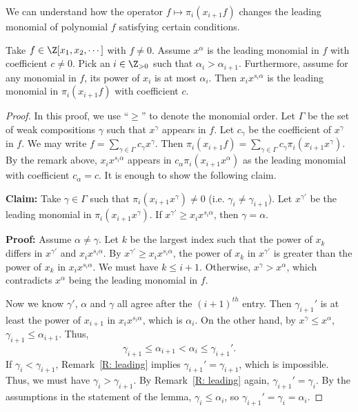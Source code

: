 We can understand how the operator
$f \mapsto \pi_i(x_{i+1} f)$ changes 
the leading monomial of polynomial $f$
satisfying certain conditions. 

\begin{lemma}
\label{L: monomials from operator}
Take $f \in \Z[x_1, x_2, \cdots ]$ with $f \neq 0$.
Assume $x^\alpha$ is the leading monomial in $f$ 
with coefficient $c \neq 0$.
Pick an $i\in \Z_{>0}$ such that $\alpha_{i} > \alpha_{i+1}$.
Furthermore, assume for any monomial in $f$, 
its power of $x_{i}$ is at most $\alpha_{i}$.
Then $x_ix^{s_i \alpha}$ is the leading monomial in
$\pi_{i}(x_{i+1}f)$ with coefficient $c$. 
\end{lemma}
\begin{proof}
In this proof, we use ``$\geq$'' to denote the 
monomial order.
Let $\Gamma$ be the set of weak compositions $\gamma$
such that $x^\gamma$ appears in $f$.
Let $c_\gamma$ be the coefficient of $x^\gamma$ in $f$.
We may write $f = \sum_{\gamma \in \Gamma} c_\gamma x^\gamma$.
Then 
$\pi_{i}(x_{i+1}f) = \sum_{\gamma \in \Gamma} c_\gamma \pi_{i}(x_{i+1}x^\gamma)$.
By the remark above, $x_ix^{s_i \alpha}$ appears 
in $c_\alpha\pi_i(x_{i+1}x^\alpha)$ as the leading monomial
with coefficient $c_\alpha = c$.
It is enough to show the following claim.

\noindent\textbf{Claim:} 
Take $\gamma \in \Gamma$ such that 
$\pi_i(x_{i+1}x^{\gamma}) \neq 0$ 
(i.e. $\gamma_i \neq \gamma_{i+1}$). 
Let $x^{\gamma'}$ be the leading monomial 
in $\pi_i(x_{i+1}x^{\gamma})$.
If $x^{\gamma'}  \geq x_ix^{s_i \alpha}$,
then $\gamma = \alpha$.

\noindent\textbf{Proof:} 
Assume $\alpha \neq \gamma$.
Let $k$ be the largest index such that 
the power of $x_k$ differs in $x^{\gamma'}$ and $x_ix^{s_i \alpha}$.
By $x^{\gamma'}  \geq x_ix^{s_i \alpha}$,
the power of $x_k$ in $x^{\gamma'}$ is greater than
the power of $x_k$ in $x_ix^{s_i \alpha}$.
We must have $k \leqslant i+1$.
Otherwise,
$x^\gamma > x^\alpha$,
which contradicts $x^\alpha$ being the leading monomial in $f$.

Now we know 
$\gamma'$, $\alpha$ and $\gamma$ all agree after 
the $(i+1)^{th}$ entry.
Then
$\gamma_{i+1}'$ is at least
the power of $x_{i+1}$ in $x_ix^{s_i \alpha}$,
which is $\alpha_i$.
On the other hand, by $x^\gamma \leqslant x^\alpha$,
$\gamma_{i+1} \leqslant \alpha_{i+1}$.
Thus, 
\begin{equation}
\label{EQ: chain inequality}
\gamma_{i+1} \leq  \alpha_{i+1}<\alpha_i \leq \gamma_{i+1}'.
\end{equation}
If $\gamma_{i} < \gamma_{i+1}$,
Remark~\ref{R: leading} implies $\gamma_{i+1}'= \gamma_{i+1}$,
which is impossible.
Thus, we must have $\gamma_i > \gamma_{i+1}$. 
By Remark~\ref{R: leading} again, $\gamma_{i+1}' = \gamma_i$.
By the assumptions in the statement of the lemma, $\gamma_i \leqslant \alpha_i$,
so $\gamma_{i+1}' = \gamma_i = \alpha_i$.


\end{proof}
